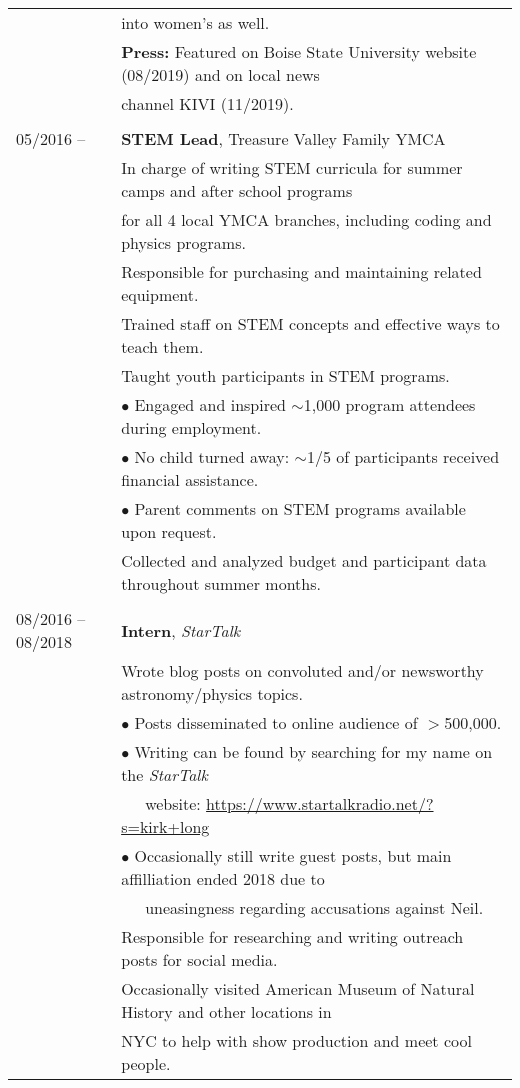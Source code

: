 \documentclass[11pt]{article}
\begin{document}
\begin{tabular}{ll}
      & into women's as well.\vspace{1mm} \\
      & \textbf{Press:} Featured on Boise State University website (08/2019) and on local news \\
      & channel KIVI (11/2019). \\
      & \\
05/2016 --    &   \textbf{STEM Lead}, Treasure Valley Family YMCA \vspace{1mm} \\
      & In charge of writing STEM curricula for summer camps and after school programs \\
      & for all 4 local YMCA branches, including coding and physics programs. \vspace{0.5mm}\\
      & Responsible for purchasing and maintaining related equipment. \vspace{0.5mm}\\
      & Trained staff on STEM concepts and effective ways to teach them. \vspace{0.5mm} \\
      & Taught youth participants in STEM programs. \\
      & $\bullet$ Engaged and inspired $\sim$1,000 program attendees during employment. \\
      & $\bullet$ No child turned away: $\sim$1/5 of participants received financial assistance. \\
      & $\bullet$ Parent comments on STEM programs available upon request. \vspace{1mm} \\
      & Collected and analyzed budget and participant data throughout summer months. \\
      & \\
08/2016 -- 08/2018    &   \textbf{Intern}, \textit{StarTalk} \vspace{1mm} \\
      & Wrote blog posts on convoluted and/or newsworthy astronomy/physics topics. \\
      & $\bullet$ Posts disseminated to online audience of $>$500,000. \\
      & $\bullet$ Writing can be found by searching for my name on the \textit{StarTalk} \\
      & \-\ \-\ \-\ website: \url{https://www.startalkradio.net/?s=kirk+long} \\
      & $\bullet$ Occasionally still write guest posts, but main affilliation ended 2018 due to \\
      & \-\ \-\ \-\ uneasingness regarding accusations against Neil. \vspace{1mm} \\
      & Responsible for researching and writing outreach posts for social media. \\
      & Occasionally visited American Museum of Natural History and other locations in \\
      & NYC to help with show production and meet cool people. \\

\end{tabular}
\end{document}
